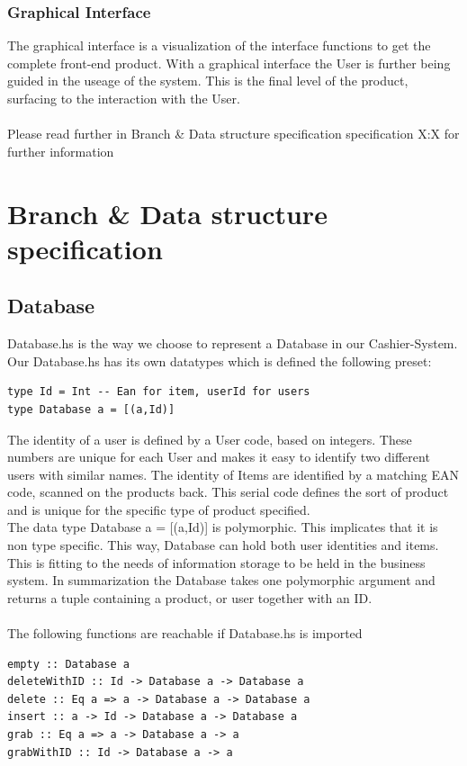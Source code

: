 \documentclass[11pt]{article}
\begin{document}
\subsubsection{Graphical Interface}
The graphical interface is a visualization of the interface functions to get the complete front-end product. With a graphical interface the User is further being guided in the useage of the system. This is the final level of the product, surfacing to the interaction with the User.
\\\\
Please read further in Branch \& Data structure specification specification X:X for further information
\section{Branch \& Data structure specification}
\subsection{Database}
Database.hs is the way we choose to represent a Database in our Cashier-System. Our Database.hs has its own datatypes which is defined the following preset:
\begin{lstlisting}
type Id = Int -- Ean for item, userId for users
type Database a = [(a,Id)]
\end{lstlisting}

The identity of a user is defined by a User code, based on integers. These numbers are unique for each User and makes  it easy to identify two different users with similar names.
The identity of Items are identified by a matching EAN code, scanned on the products back. This serial code defines the sort of product and is unique for the specific type of product specified.
\\
The data type Database a = [(a,Id)]  is polymorphic. This implicates that it is non type specific.  This way, Database can hold both user identities and items. This is fitting to the needs of information storage to be held in the business system. In summarization the Database takes one polymorphic argument and returns a tuple containing a product, or user together with an ID.
\\\\
The following functions are reachable if Database.hs is imported
\begin{lstlisting}
empty :: Database a
deleteWithID :: Id -> Database a -> Database a
delete :: Eq a => a -> Database a -> Database a
insert :: a -> Id -> Database a -> Database a
grab :: Eq a => a -> Database a -> a
grabWithID :: Id -> Database a -> a
\end{lstlisting}
\end{document}
